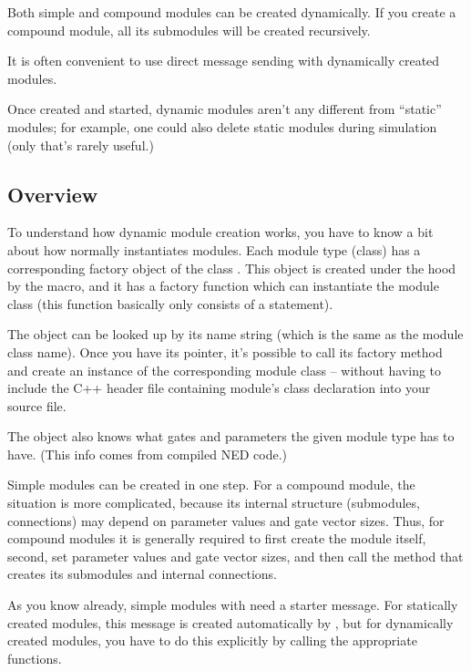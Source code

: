 Both simple and compound modules can be created dynamically.
If you create a compound module, all its submodules will be created
recursively.

It is often convenient to use direct message sending with dynamically
created modules.

Once created and started, dynamic modules aren't any different from
``static'' modules; for example, one could also delete static modules
during simulation (only that's rarely useful.)


\subsection{Overview}


To understand how dynamic module creation works, you have to know a
bit about how normally {\opp} instantiates modules. Each module type
(class) has a corresponding factory object of the class
. This object is created under the hood by the
 macro, and it has a factory
function which can instantiate the module
class (this function basically only consists of a  statement).

The  object can be looked up by its name
string (which is the same as the module class name). Once you have its
pointer, it's possible to call its factory method and create an
instance of the corresponding module class -- without having to
include the C++ header file containing module's class declaration
into your source file.

The  object also knows what gates and
parameters the given module type has to have. (This info comes from
compiled NED code.)

Simple modules can be created in one step. For a compound module, the
situation is more complicated, because its internal structure
(submodules, connections) may depend on parameter values and gate
vector sizes. Thus, for compound modules it is generally required to
first create the module itself, second, set parameter values and gate
vector sizes, and then call the method that creates its submodules and
internal connections.

As you know already, simple modules with  need a
starter message. For statically created
modules, this message is created automatically by {\opp}, but for
dynamically created modules, you have to do this explicitly by calling
the appropriate functions.

